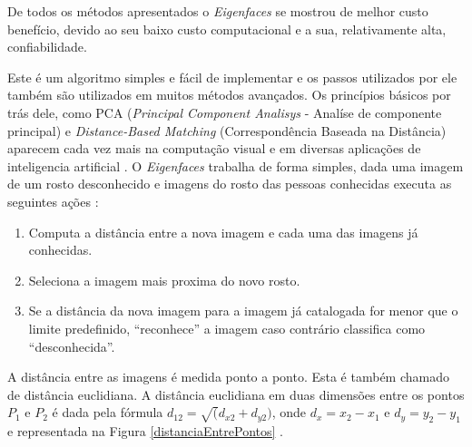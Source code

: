 
De todos os métodos apresentados o \textit{Eigenfaces} se mostrou de melhor custo benefício, devido ao seu baixo custo computacional e a sua, relativamente alta, confiabilidade.

Este é um algoritmo simples e fácil de implementar e os passos utilizados por ele também são utilizados em muitos métodos avançados. Os princípios básicos por trás dele, como PCA (\textit{Principal Component Analisys} - Analíse de componente principal) e \textit{Distance-Based Matching} (Correspondência Baseada na Distância) aparecem cada vez mais na computação visual e em diversas aplicações de inteligencia artificial \cite{hewitt}.
O \textit{Eigenfaces} trabalha de forma simples, dada uma imagem de um rosto desconhecido e imagens do rosto das pessoas conhecidas executa as seguintes ações \cite{hewitt}:
	\begin{enumerate}
		\item Computa a distância entre a nova imagem e cada uma das imagens já conhecidas.
		\item Seleciona a imagem mais proxima do novo rosto.
		\item Se a distância da nova imagem para a imagem já catalogada for menor que o limite predefinido, ``reconhece'' a imagem caso contrário classifica como ``desconhecida''.
	\end{enumerate}

A distância entre as imagens é medida ponto a ponto. Esta é também chamado de distância euclidiana. A distância euclidiana em duas dimensões entre os pontos $P_1$ e $P_2$ é dada pela fórmula $\displaystyle d_{12} = \sqrt(d_{x2} + d_{y2})$, onde $\displaystyle d_x = x_2 - x_1$ e $\displaystyle d_y = y_2-y_1$ e representada na Figura \ref{distanciaEntrePontos} \cite{hewitt}.

